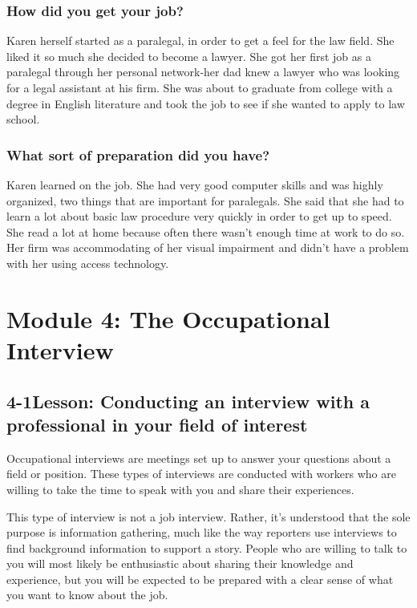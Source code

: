 \subsubsection*{How did you get your job?}
\break Karen herself started as a paralegal, in order to get a feel for the law field. She liked it so much she decided to become a lawyer. She got her first job as a paralegal through her personal network-her dad knew a lawyer who was looking for a legal assistant at his firm. She was about to graduate from college with a degree in English literature and took the job to see if she wanted to apply to law school.

\subsubsection*{What sort of preparation did you have?}
\break Karen learned on the job. She had very good computer skills and was highly organized, two things that are important for paralegals. She said that she had to learn a lot about basic law procedure very quickly in order to get up to speed. She read a lot at home because often there wasn't enough time at work to do so. Her firm was accommodating of her visual impairment and didn't have a problem with her using access technology.

\pagebreak \section*{Module 4:	The Occupational Interview}
\noindent\makebox[\textwidth]{\rule{\linewidth}{0.4pt}}
\localtableofcontents
\noindent\makebox[\textwidth]{\rule{\linewidth}{0.4pt}}


\pagebreak \subsection*{4-1\quad  Lesson: Conducting an interview with a professional in your field of interest}
Occupational interviews are meetings set up to answer your questions about a field or position. These types of interviews are conducted with workers who are willing to take the time to speak with you and share their experiences.

This type of interview is not a job interview. Rather, it's understood that the sole purpose is information gathering, much like the way reporters use interviews to find background information to support a story. People who are willing to talk to you will most likely be enthusiastic about sharing their knowledge and experience, but you will be expected to be prepared with a clear sense of what you want to know about the job.

